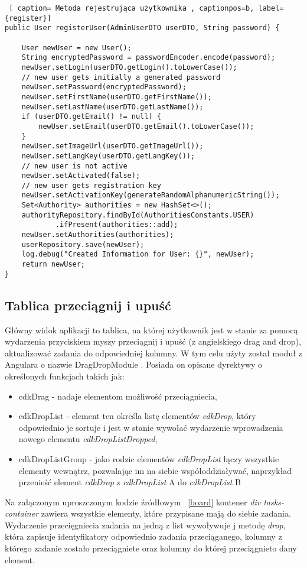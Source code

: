 \begin{lstlisting} [ caption= Metoda rejestrująca użytkownika , captionpos=b, label={register}]
public User registerUser(AdminUserDTO userDTO, String password) {
			
	User newUser = new User();
	String encryptedPassword = passwordEncoder.encode(password);
	newUser.setLogin(userDTO.getLogin().toLowerCase());
	// new user gets initially a generated password
	newUser.setPassword(encryptedPassword);
	newUser.setFirstName(userDTO.getFirstName());
	newUser.setLastName(userDTO.getLastName());
	if (userDTO.getEmail() != null) {
		newUser.setEmail(userDTO.getEmail().toLowerCase());
	}
	newUser.setImageUrl(userDTO.getImageUrl());
	newUser.setLangKey(userDTO.getLangKey());
	// new user is not active
	newUser.setActivated(false);
	// new user gets registration key
	newUser.setActivationKey(generateRandomAlphanumericString());
	Set<Authority> authorities = new HashSet<>();
	authorityRepository.findById(AuthoritiesConstants.USER)
			.ifPresent(authorities::add);
	newUser.setAuthorities(authorities);
	userRepository.save(newUser);
	log.debug("Created Information for User: {}", newUser);
	return newUser;
}
\end{lstlisting}
\clearpage
\subsection{Tablica przeciągnij i upuść}
Główny widok aplikacji to tablica, na której użytkownik jest w stanie za pomocą wydarzenia przyciskiem myszy przeciągnij i upuść (z angielskiego drag and drop), aktualizować zadania do odpowiedniej kolumny. W tym celu użyty został moduł z Angulara o nazwie DragDropModule \cite{draganddrop}. Posiada on opisane dyrektywy o określonych funkcjach takich jak:
\begin{itemize}
		\item cdkDrag - nadaje elementom możliwość przeciągniecia,
		\item cdkDropList - element ten określa listę elementów \textit{cdkDrop}, który odpowiednio je sortuje i jest w stanie wywołać wydarzenie wprowadzenia nowego elementu \textit{cdkDropListDropped},
		\item cdkDropListGroup - jako rodzic elementów \textit{cdkDropList} łączy wszystkie elementy wewnątrz, pozwalając im na siebie współoddziaływać, naprzykład przenieść element \textit{cdkDrop}  z \textit{cdkDropList} A do \textit{cdkDropList} B
\end{itemize}
Na załączonym uproszczonym kodzie źródłowym ~\ref{board} kontener \textit{div tasks-container} zawiera wszystkie elementy, które przypisane mają do siebie zadania. Wydarzenie przecięgniecia zadania na jedną z list wywoływuje j metodę \textit{drop}, która zapisuje identyfikatory odpowiednio zadania przeciąganego, kolumny z którego zadanie zostało przeciągniete oraz kolumny do której przeciągnieto dany element.


